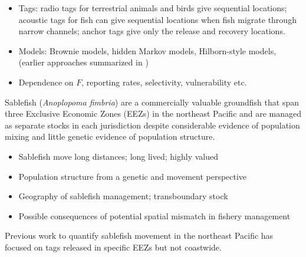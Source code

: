 \documentclass{article}
\begin{document}
\begin{itemize}
\item Tags: radio tags for terrestrial animals and birds give sequential locations; acoustic tags for fish can give sequential locations when fish migrate through narrow channels; anchor tags give only the release and recovery locations. %
\item Models: Brownie models, hidden Markov models, Hilborn-style models, (earlier approaches summarized in \cite{hilborn1990})
\item Dependence on $F$, reporting rates, selectivity, vulnerability etc. %
\end{itemize}

\noindent Sablefish (\textit{Anoplopoma fimbria}) are a commercially valuable groundfish that span three Exclusive Economic Zones (EEZs) in the northeast Pacific and are managed as separate stocks in each jurisdiction despite considerable evidence of population mixing and little genetic evidence of population structure.

\begin{itemize}
\item Sablefish move long distances; long lived; highly valued
\item Population structure from a genetic and movement perspective
\item Geography of sablefish management; transboundary stock
\item Possible consequences of potential spatial mismatch in fishery management
\end{itemize}

\noindent Previous work to quantify sablefish movement in the northeast Pacific has focused on tags released in specific EEZs but not coastwide.
\end{document}
